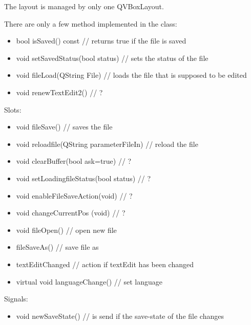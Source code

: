 \documentclass[11pt]{article}
\begin{document}
The layout is managed by only one QVBoxLayout. 

There are only a few method implemented in the class: 
\begin{itemize}
\item bool isSaved() const // returns true if the file is saved
\item void setSavedStatus(bool status) // sets the status of the file
\item void fileLoad(QString File) // loads the file that is supposed to be edited
\item void renewTextEdit2() // ?
\end{itemize}

Slots:
\begin{itemize}
\item void fileSave() // saves the file
\item void reloadfile(QString parameterFileIn) // reload the file
\item void clearBuffer(bool ask=true) // ?
\item void setLoadingfileStatus(bool status) // ?
\item void enableFileSaveAction(void) // ?
\item void changeCurrentPos (void) // ?
\item void fileOpen() // open new file
\item fileSaveAs() // save file as
\item textEditChanged // action if textEdit has been changed
\item virtual void languageChange() // set language
\end{itemize}

Signals:
\begin{itemize}
\item void newSaveState() // is send if the save-state of the file changes
\end{itemize}
\end{document}
